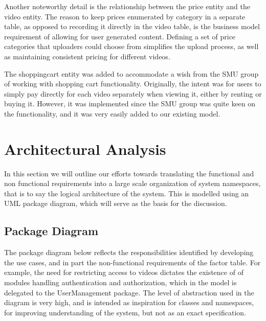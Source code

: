 Another noteworthy detail is the relationship between the price entity and the video entity. The reason to keep prices enumerated by category in a separate table, as opposed to recording it directly in the video table, is the business model requirement of allowing for user generated content. Defining a set of price categories that uploaders could choose from simplifies the upload process, as well as maintaining consistent pricing for different videos.

The shoppingcart entity was added to accommodate a wish from the SMU group of working with shopping cart functionality. Originally, the intent was for users to simply pay directly for each video separately when viewing it, either by renting or buying it. However, it was implemented since the SMU group was quite keen on the functionality, and it was very easily added to our existing model.

\section{Architectural Analysis}
In this section we will outline our efforts towards translating the functional and non functional requirements into a large scale organization of system namespaces, that is to say the logical architecture of the system. This is modelled using an UML package diagram, which will serve as the basis for the discussion.
\subsection{Package Diagram}
The package diagram below reflects the responsibilities identified by developing the use cases, and in part the non-functional requirements of the factor table. For example, the need for restricting access to videos dictates the existence of of modules handling authentication and authorization, which in the model is delegated to the UserManagement package. The level of abstraction used in the diagram is very high, and is intended as inspiration for classes and namespaces, for improving understanding of the system, but not as an exact specification.

